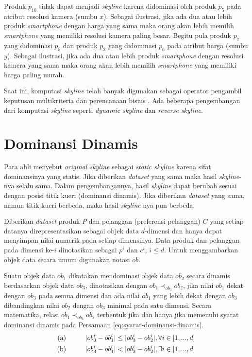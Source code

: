 Produk $p_{10}$ tidak dapat menjadi \textit{skyline} karena didominasi oleh produk $p_5$ pada atribut resolusi kamera (sumbu $x$). Sebagai ilustrasi, jika ada dua atau lebih produk \textit{smartphone} dengan harga yang sama maka orang akan lebih memilih \textit{smartphone} yang memiliki resolusi kamera paling besar. Begitu pula produk $p_7$ yang didominasi $p_5$ dan produk $p_2$ yang didominasi $p_6$ pada atribut harga (sumbu $y$). Sebagai ilustrasi, jika ada dua atau lebih produk \textit{smartphone} dengan resolusi kamera yang sama maka orang akan lebih memilih \textit{smartphone} yang memiliki harga paling murah. 

Saat ini, komputasi \textit{skyline} telah banyak digunakan sebagai operator pengambil keputusan multikriteria dan perencanaan bisnis \cite{dynamic-skyline-2}. Ada beberapa pengembangan dari komputasi \textit{skyline} seperti \textit{dynamic skyline} dan \textit{reverse skyline}.  

\section{Dominansi Dinamis}

\tab Para ahli menyebut \textit{original skyline} sebagai \textit{static skyline} \cite{dynamic-skyline-2} karena sifat dominansinya yang statis. Jika diberikan \textit{dataset} yang sama maka hasil \textit{skyline}-nya selalu sama. Dalam pengembangannya, hasil \textit{skyline} dapat berubah sesuai dengan posisi titik kueri (dominansi dinamis). Jika diberikan \textit{dataset} yang sama, namun titik kueri berbeda, maka hasil \textit{skyline}-nya pun berbeda. 

\pagebreak
Diberikan \textit{dataset} produk $P$ dan pelanggan (preferensi pelanggan) $C$ yang setiap datanya direpresentasikan sebagai objek data $d$-dimensi dan hanya dapat menyimpan nilai numerik pada setiap dimensinya. Data produk dan pelanggan pada dimensi ke-$i$ dinotasikan sebagai $p^i$ dan $c^i$, $i \leq d$. Untuk menggambarkan objek data secara umum digunakan notasi $ob$.

Suatu objek data $ob_1$ dikatakan mendominasi objek data $ob_2$ secara dinamis berdasarkan objek data $ob_3$, dinotasikan dengan $ob_1 \prec_{ob_3} ob_2$, jika nilai $ob_1$ dekat dengan $ob_3$ pada semua dimensi dan ada nilai $ob_1$ yang lebih dekat dengan $ob_3$ dibandingkan nilai $ob_2$ dengan $ob_3$ minimal pada satu dimensi. Secara matematika, relasi $ob_1 \prec_{ob_3} ob_2$ terbentuk jika dan hanya jika memenuhi syarat dominansi dinamis pada Persamaan \ref{eq:syarat-dominansi-dinamis}.
\begin{equation}\label{eq:syarat-dominansi-dinamis}
\begin{split}
\text{(a)} \hspace*{1cm} |ob_3^i - ob_1^i| \leq |ob_3^i - ob_2^i|, \forall i \in [1, ..., d] \\
\text{(b)} \hspace*{1cm} |ob_3^i - ob_1^i| < |ob_3^i - ob_2^i|, \exists i \in [1, ..., d]
\end{split}
\end{equation}

